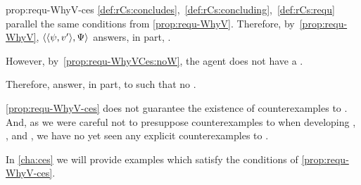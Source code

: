 \begin{note}
  \begin{argument}{prop:requ-WhyV-ces}
    \ref{def:rCs:concludes},~\ref{def:rCs:concluding},~\ref{def:rCs:requ} parallel the same conditions from \autoref{prop:requ-WhyV}.
    Therefore, by~\autoref{prop:requ-WhyV}, \(\langle \langle \psi, v' \rangle, \Psi \rangle\) answers, in part, \qWhyV{}.

    However, by~\ref{prop:requ-WhyVCes:noW}, the agent does not have a \wit{}.

    Therefore, answer, in part, to \qWhyV{} such that no \wit{}.
  \end{argument}
\end{note}

\begin{note}
  \autoref{prop:requ-WhyV-ces} does not guarantee the existence of counterexamples to \issueConstraint{}.
  And, as we were careful not to presuppose counterexamples to \issueConstraint{} when developing , , and , we have no yet seen any explicit counterexamples to \issueConstraint{}.

  In \autoref{cha:ces} we will provide examples which satisfy the conditions of \autoref{prop:requ-WhyV-ces}.
\end{note}

